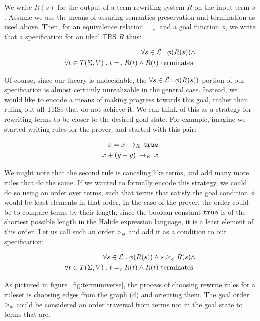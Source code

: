 We write $R(s)$ for the output of a term rewriting system $R$ on the input term $s$. Assume we use the means of assuring semantics preservation and termination as used above. Then, for an equivalence relation $=_e$ and a goal function $\phi$, we write that a specification for an ideal TRS $R$ thus:

\begin{align*}
\forall s \in \mathcal{L} \;.\; \phi(R(s)) \wedge \\
\forall t \in T(\Sigma,V) \;.\; t =_e R(t) \wedge R(t) \textrm{ terminates }
\end{align*}

Of course, since our theory is undecidable, the $\forall s \in \mathcal{L} \;.\; \phi(R(s))$ portion of our specification is almost certainly unrealizable in the general case. Instead, we would like to encode a means of making progress towards this goal, rather than ruling out all TRSs that do not achieve it. We can think of this as a strategy for rewriting terms to be closer to the desired goal state. For example, imagine we started writing rules for the prover, and started with this pair:

\begin{align*}
    x = x \:\rightarrow_{R}\: \texttt{true} \\
    x + (y - y) \:\rightarrow_{R}\: x
\end{align*}

We might note that the second rule is canceling like terms, and add many more rules that do the same. If we wanted to formally encode this strategy, we could do so using an order over terms, such that terms that satisfy the goal condition $\phi$ would be least elements in that order. In the case of the prover, the order could be to compare terms by their length; since the boolean constant $\texttt{true}$ is of the shortest possible length in the Halide expression language, it is a least element of this order. Let us call such an order $>_{\phi}$ and add it as a condition to our specification:

\begin{align*}
\forall s \in \mathcal{L} \;.\; \phi(R(s)) \wedge  s \geq_{\phi} R(s) \wedge \\
\forall t \in T(\Sigma,V) \;.\; t =_e R(t) \wedge  R(t) \textrm{ terminates }
\end{align*}

As pictured in figure~\ref{fig:termuniverse}, the process of choosing rewrite rules for a ruleset is choosing edges from the graph (d) and orienting them. The goal order $>_{\phi}$ could be considered an order traversal from terms not in the goal state to terms that are. 

